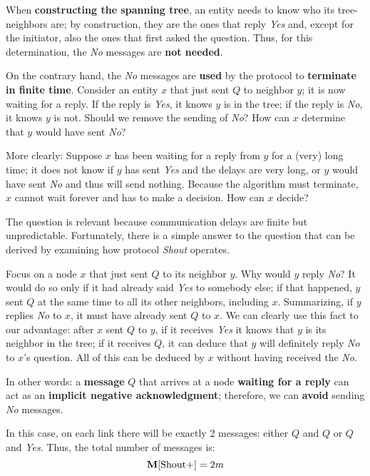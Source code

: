 When \textbf{constructing the spanning tree}, an entity needs to know who its tree-neighbors are; by construction, they are the ones that reply \textit{Yes} and, except for the initiator, also the ones that first asked the question. Thus, for this determination, the \textit{No} messages are \textbf{not needed}. 

On the contrary hand, the \textit{No} messages are \textbf{used} by the protocol to \textbf{terminate in finite time}. Consider an entity $x$ that just sent $Q$ to neighbor $y$; it is now waiting for a reply. If the reply is \textit{Yes}, it knows $y$ is in the tree; if the reply is \textit{No}, it knows $y$ is not. Should we remove the sending of \textit{No}? How can $x$ determine that $y$ would have sent \textit{No}? 

More clearly: Suppose $x$ has been waiting for a reply from $y$ for a (very) long time; it does not know if $y$ has sent \textit{Yes} and the delays are very long, or $y$ would have sent \textit{No} and thus will send nothing. Because the algorithm must terminate, $x$ cannot wait forever and has to make a decision. How can $x$ decide? 

The question is relevant because communication delays are finite but unpredictable. Fortunately, there is a simple answer to the question that can be derived by examining how protocol \textit{Shout} operates. 

Focus on a node $x$ that just sent $Q$ to its neighbor $y$. Why would $y$ reply \textit{No}? It would do so only if it had already said \textit{Yes} to somebody else; if that happened, $y$ sent $Q$ at the same time to all its other neighbors, including $x$. Summarizing, if $y$ replies \textit{No} to $x$, it must have already sent $Q$ to $x$. We can clearly use this fact to our advantage: after $x$ sent $Q$ to $y$, if it receives \textit{Yes} it knows that $y$ is its neighbor in the tree; if it receives $Q$, it can deduce that $y$ will definitely reply \textit{No} to $x$’s question. All of this can be deduced by $x$ without having received the \textit{No}. 

In other words: a \textbf{message} $Q$ that arrives at a node \textbf{waiting for a reply} can act as an \textbf{implicit negative acknowledgment}; therefore, we can \textbf{avoid} sending \textit{No} messages.


In this case, on each link there will be exactly 2 messages: either $Q$ and $Q$ or $Q$ and \textit{Yes}. Thus, the total number of messages is:
$$
\mathbf{M}[\text{Shout+}] = 2m
$$

